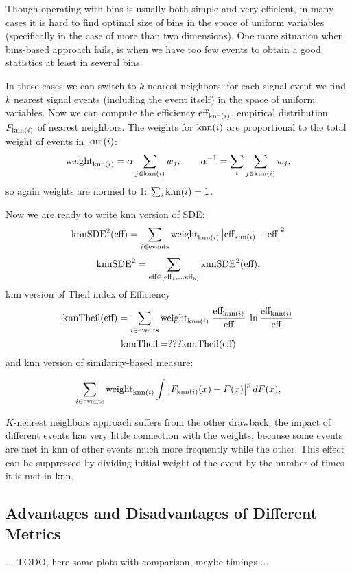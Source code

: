 \def\knnSDE{\text{knnSDE}}

Though operating with bins is usually both simple and very efficient, 
in many cases it is hard to find optimal size of bins in the space of uniform variables (specifically in the case of more than two dimensions).
One more situation when bins-based approach fails, is when we have too few events to obtain a good statistics at least in several bins.

In these cases we can switch to $k$-nearest neighbors: for each signal event we find $k$ nearest signal events (including the event itself) in the space of uniform variables. Now we can compute the efficiency $\text{eff}_{\text{knn}(i)}$, empirical distribution $F_{\text{knn}(i)}$ of nearest neighbors. 
The weights for $\text{knn}(i)$ are proportional to the total weight of events in $\text{knn}(i)$:
\[
	\text{weight}_{\text{knn}(i)} = \alpha \sum_{j \in \text{knn}(i)} w_j, \qquad \alpha^{-1} = \sum_i \sum_{j \in \text{knn}(i)} w_j,
\]
so again weights are normed to 1: $\sum_{i} \text{knn}(i) = 1$. 

Now we are ready to write knn version of SDE:
\[
	\knnSDE^2(\globaleff)
		= \sum_{i \in \text{events}} \weightknni \abs{\effknni - \globaleff}^2
\]
\[
	\knnSDE^2 = \sum_{\globaleff \in [\globaleff_1, \dots \globaleff_k]}
		\knnSDE^2(\globaleff),
\]
knn version of Theil index of Efficiency
\[
	\text{knnTheil}(\text{eff}) = \sum_{i \in \text{events}} \text{weight}_{\text{knn}(i)} \; \frac{\text{eff}_{\text{knn}(i)}}{\text{eff}} \; \ln{\frac{\text{eff}_{\text{knn}(i)}}{\text{eff}}}
\]
\[
	\text{knnTheil} = ??? \text{knnTheil}(\text{eff})
\]
and knn version of similarity-based measure:

\[
	 \sum_{i \in \text{events}} \text{weight}_{\text{knn}(i)} \int \left\vert F_{\text{knn}(i)}(x) - F(x)\right\vert^p dF(x),
\]


$K$-nearest neighbors approach suffers from the other drawback: the impact of different events has very little connection with the weights, because some events are met in knn of other events much more frequently while the other.
This effect can be suppressed by dividing initial weight of the event by the number of times it is met in knn. 




\subsection{Advantages and Disadvantages of Different Metrics}

... TODO, here some plots with comparison, maybe timings ...
